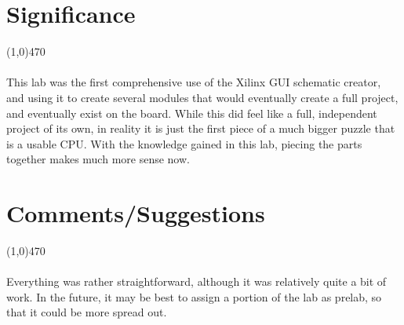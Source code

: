 \documentclass[12pt]{article}
\begin{document}
	\newpage
\section{Significance} \vspace{-.7cm} \line(1,0){470}
	\paragraph{}
		This lab was the first comprehensive use of the Xilinx GUI schematic creator, and using it to create several modules that would eventually create a full project, and eventually exist on the board. While this did feel like a full, independent project of its own, in reality it is just the first piece of a much bigger puzzle that is a usable CPU. With the knowledge gained in this lab, piecing the parts together makes much more sense now. 

 \section{Comments/Suggestions}\vspace{-.7cm} \line(1,0){470}
 	\paragraph{}
		Everything was rather straightforward, although it was relatively quite a bit of work. In the future, it may be best to assign a portion of the lab as prelab, so that it could be more spread out.
		
\end{document}

